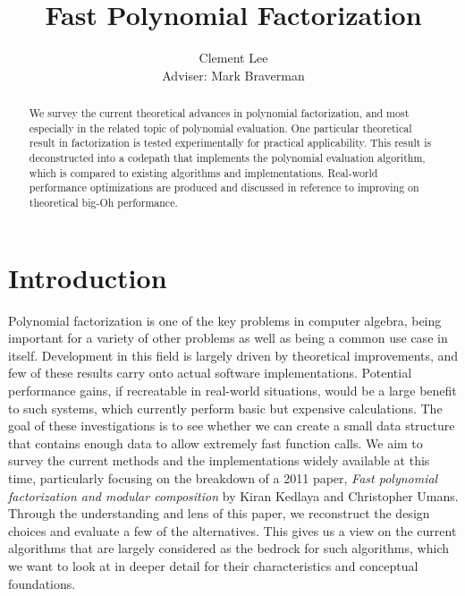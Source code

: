 \documentclass[pageno]{jpaper}
\begin{document}
\title{Fast Polynomial Factorization}

\author{Clement Lee\\Adviser: Mark Braverman}

\date{}
\maketitle

\thispagestyle{empty}
\doublespacing
\begin{abstract}
  We survey the current theoretical advances in polynomial factorization, and most especially in the related topic of polynomial evaluation.
  One particular theoretical result in factorization\cite{kedlaya2011fast} is tested experimentally for practical applicability.
  This result is deconstructed into a codepath that implements the polynomial evaluation algorithm, which is compared to existing algorithms and implementations.
  Real-world performance optimizations are produced and discussed in reference to improving on theoretical big-Oh performance.
\end{abstract}

\section{Introduction}
Polynomial factorization is one of the key problems in computer algebra, being important for a variety of other problems as well as being a common use case in itself.
Development in this field is largely driven by theoretical improvements, and few of these results carry onto actual software implementations.
Potential performance gains, if recreatable in real-world situations, would be a large benefit to such systems, which currently perform basic but expensive calculations.
The goal of these investigations is to see whether we can create a small data structure that contains enough data to allow extremely fast function calls.
We aim to survey the current methods and the implementations widely available at this time, particularly focusing on the breakdown of a 2011 paper, \emph{Fast polynomial factorization and modular composition} by Kiran Kedlaya and Christopher Umans.
Through the understanding and lens of this paper, we reconstruct the design choices and evaluate a few of the alternatives.
This gives us a view on the current algorithms that are largely considered as the bedrock for such algorithms, which we want to look at in deeper detail for their characteristics and conceptual foundations.
\end{document}
